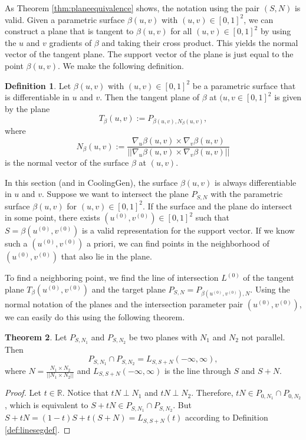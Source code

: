 \documentclass[a4paper, 11pt]{report}
\theoremstyle{definition}
\newtheorem{definition}{Definition}[section]
\newtheorem{theorem}[definition]{Theorem}
\begin{document}
	As Theorem \ref{thm:planeequivalence} shows, the notation using the pair $(S,N)$ is valid. Given a parametric surface $\beta(u,v)$ with $(u,v) \in [0,1]^2$, we can construct a plane that is tangent to $\beta(u, v)$ for all $(u,v) \in [0,1]^2$ by using the $u$ and $v$ gradients of $\beta$ and taking their cross product. This yields the normal vector of the tangent plane. The support vector of the plane is just equal to the point $\beta(u,v)$. We make the following definition.

	\begin{definition}\label{def:tangentplanenormal}
		Let $\beta(u,v)$ with $(u,v) \in [0,1]^2$ be a parametric surface that is differentiable in $u$ and $v$. Then the tangent plane of $\beta$ at $(u, v \in [0,1]^2$ is given by the plane
			$$T_{\beta}(u, v) := P_{\beta(u,v), N_{\beta}(u,v)},$$
		where 
			$$N_{\beta}(u,v) := \frac{\nabla_u \beta(u,v) \times \nabla_v \beta(u,v)}{||\nabla_u \beta(u,v) \times \nabla_v \beta(u,v)||}$$
		is the normal vector of the surface $\beta$ at $(u, v)$.
	\end{definition}

	In this section (and in CoolingGen), the surface $\beta(u,v)$ is always differentiable in $u$ and $v$. Suppose we want to intersect the plane $P_{S,N}$ with the parametric surface $\beta(u,v)$ for $(u,v) \in [0,1]^2$. If the surface and the plane do intersect in some point, there exists $(u^{(0)}, v^{(0)}) \in [0,1]^2$ such that $S = \beta(u^{(0)}, v^{(0)})$ is a valid representation for the support vector. If we know such a $(u^{(0)}, v^{(0)})$ a priori, we can find points in the neighborhood of $(u^{(0)}, v^{(0)})$ that also lie in the plane.

	To find a neighboring point, we find the line of intersection $L^{(0)}$ of the tangent plane $T_{\beta}(u^{(0)}, v^{(0)})$ and the target plane $P_{S,N} = P_{\beta(u^{(0)}, v^{(0)}), N}$. Using the normal notation of the planes and the intersection parameter pair $(u^{(0)}, v^{(0)})$, we can easily do this using the following theorem.

	\begin{theorem}
		Let $P_{S, N_1}$ and $P_{S, N_2}$ be two planes with $N_1$ and $N_2$ not parallel. Then
			$$ P_{S, N_1} \cap P_{S, N_2} = L_{S, S+N}(-\infty, \infty), $$
		where $N = \frac{N_1 \times N_2}{|| N_1 \times N_2 ||}$ and $L_{S,S+N}(-\infty, \infty)$ is the line through $S$ and $S+N$. 
	\end{theorem}
	\begin{proof}
		Let $t \in \mathbb{R}$. Notice that $tN \perp N_1$ and $tN \perp N_2$. Therefore, $tN \in P_{0, N_1} \cap P_{0, N_2}$, which is equivalent to $S+tN \in P_{S, N_1} \cap P_{S, N_2}$. But $S+tN = (1-t)S + t(S+N) = L_{S,S+N}(t)$ according to Definition \ref{def:linesegdef}.
	\end{proof}
\end{document}
